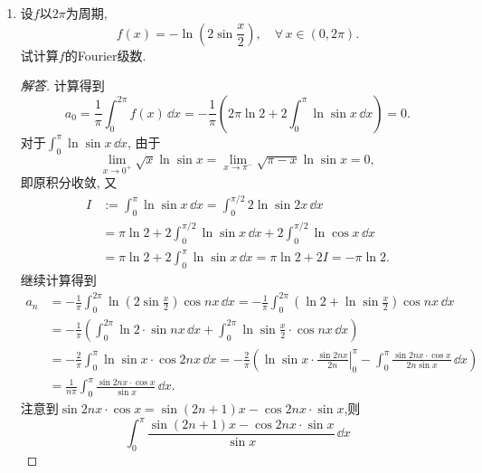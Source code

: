 \begin{quiza}
\begin{enumerate}
\begin{proof}[解答]
\begin{gather*}
a_n=\frac{2}{\pi}\int_{0}^{\pi}f(x)\cos nx\,\dd x=\frac{2(2\pi-1)(1+\cos n\pi)}{\pi n^2},\quad n\geqslant 1.
\end{gather*}
得\[f(x)\sim\frac{2\pi^3-3\pi^2}{6\pi}+\sum_{n=1}^{\infty}\frac{2(2\pi-1)(1+\cos n\pi)}{\pi n^2}\cos nx.\]
同理对\(f\)奇延拓\(f(x)=\begin{cases}
x^2-x,\, &x\in[0,\pi],\\-(x^2+x),& x\in[-\pi,0)
\end{cases}\)由\[a_0=0,\,a_n=0,\,b_n=\frac{2}{\pi}\int_{0}^{\pi}f(x)\sin nx\,\dd x=\frac{4\cos n\pi-4-2n^2(\pi^2-\pi)\cos n\pi}{\pi n^3},\quad n\geqslant 1,\]
于是\[f(x)\sim\sum_{n=1}^{\infty}\frac{4\cos n\pi-4-2n^2(\pi^2-\pi)\cos n\pi}{\pi n^3}\sin nx.\qedhere\]
\end{proof}
\item 设\(f\)以\(2\pi\)为周期,\[f(x)=-\ln\left(2\sin\frac{x}{2}\right),\quad\forall\, x\in(0,2\pi).\]试计算\(f\)的Fourier级数.
\begin{proof}[解答]
计算得到\[a_0=\frac{1}{\pi}\int_{0}^{2\pi}f(x)\,\dd x=-\frac{1}{\pi}\left(2\pi\ln 2+2\int_{0}^{\pi}\ln\sin x\,\dd x\right)=0.\]
对于\(\int_{0}^{\pi}\ln\sin x\,\dd x\), 由于
\[\lim_{x\rightarrow0^+}\sqrt{x}\ln\sin x=\lim_{x\rightarrow\pi^-}\sqrt{\pi-x}\ln\sin x=0,\]
即原积分收敛, 又\[\begin{split}
I&:=\int_{0}^{\pi}\ln\sin x\,\dd x=\int_{0}^{\pi/2}2\ln\sin 2x\,\dd x\\
&=\pi\ln 2+2\int_{0}^{\pi/2}\ln\sin x\,\dd x+2\int_{0}^{\pi/2}\ln\cos x\,\dd x\\
&=\pi\ln 2+2\int_{0}^{\pi}\ln\sin x\,\dd x=\pi\ln2+2I=-\pi\ln2. 
\end{split}\]继续计算得到 \[\begin{split}
a_n&=-\frac{1}{\pi}\int_{0}^{2\pi}\ln\left(2\sin\frac{x}{2}\right)\cos nx\,\dd x
=-\frac{1}{\pi}\int_{0}^{2\pi}\left(\ln 2+\ln\sin\frac{x}{2}\right)\cos nx\,\dd x\\
&=-\frac{1}{\pi}\left(\int_{0}^{2\pi}\ln 2\cdot\sin nx\,\dd x+\int_{0}^{2\pi}\ln\sin\frac{x}{2}\cdot\cos nx\,\dd x\right)\\
&=-\frac{2}{\pi}\int_{0}^{\pi}\ln\sin x\cdot\cos 2nx\,\dd x
=-\frac{2}{\pi}\left(\left.\ln \sin x\cdot\frac{\sin 2n x}{2n}\right|_0^\pi-\int_{0}^{\pi}\frac{\sin 2nx\cdot\cos x}{2n\sin x}\,\dd x\right)\\
&=\frac{1}{n\pi}\int_{0}^{\pi}\frac{\sin 2nx\cdot\cos x}{\sin x}\,\dd x.
\end{split}\]
注意到\(\sin 2nx\cdot\cos x=\sin(2n+1)x-\cos 2nx\cdot\sin x\),则
\[\int_{0}^{\pi}\frac{\sin(2n+1)x-\cos 2nx\cdot\sin x}{\sin x}\,\dd x
\]
\end{proof}
\end{enumerate}
\end{quiza}
